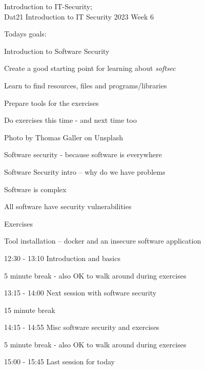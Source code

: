 \documentclass[Screen16to9,17pt]{foils}
\begin{document}
{Introduction to IT-Security;\\Dat21 Introduction to IT Security 2023 Week 6}

\hlkprofiluk



Todays goals:
\begin{list2}
\item Introduction to Software Security
\item Create a good starting point for learning about \emph{softsec}
\item Learn to find resources, files and programs/libraries
\item Prepare tools for the exercises
\item Do exercises this time - and next time too
\end{list2}

  Photo by Thomas Galler on Unsplash



\begin{list1}
\item Software security - because software is everywhere
\end{list1}



\begin{list2}
\item Software Security intro -- why do we have problems
\item Software is complex
\item All software have security vulnerabilities
\end{list2}

Exercises
\begin{list2}
\item Tool installation -- docker and an insecure software application
\end{list2}




\begin{list1}
\item 12:30 - 13:10 Introduction and basics
\item 5 minute break - also OK to walk around during exercises
\item 13:15 - 14:00 Next session with software security
\item 15 minute break
\item 14:15 - 14:55 Misc software security and exercises
\item 5 minute break - also OK to walk around during exercises
\item 15:00 - 15:45 Last session for today
\end{list1}
\end{document}
